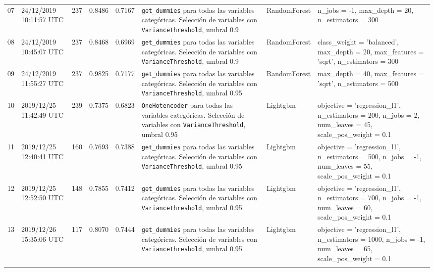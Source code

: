 \documentclass[a4paper, 20pt]{article}
\begin{document}
\begin{longtable}{lL{2cm}lllL{3cm}L{2.5cm}L{3.5cm}}
07 & 24/12/2019 10:11:57 UTC & 237 & 0.8486 & 0.7167 & \texttt{get\_dummies} para todas las variables categóricas. Selección de variables con \texttt{VarianceThreshold}, umbral 0.9 & RandomForest & {\ttfamily n\_jobs = -1, max\_depth = 20, n\_estimators = 300}\\
\midrule

08 & 24/12/2019 10:45:07 UTC & 237 & 0.8468 & 0.6969 & \texttt{get\_dummies} para todas las variables categóricas. Selección de variables con \texttt{VarianceThreshold}, umbral 0.9 & RandomForest & {\ttfamily class\_weight = 'balanced', max\_depth = 20, max\_features = 'sqrt', n\_estimators = 300}\\
\midrule

09 & 24/12/2019 11:55:27 UTC & 237 & 0.9825 & 0.7177 & \texttt{get\_dummies} para todas las variables categóricas. Selección de variables con \texttt{VarianceThreshold}, umbral 0.95 & RandomForest & {\ttfamily max\_depth = 40, max\_features = 'sqrt', n\_estimators = 500}\\
\midrule

10 & 2019/12/25 11:42:49 UTC & 239 & 0.7375 & 0.6823 & \texttt{OneHotencoder} para todas las variables categóricas. Selección de variables con \texttt{VarianceThreshold}, umbral 0.95 & Lightgbm & {\ttfamily objective = 'regression\_l1', n\_estimators = 200, n\_jobs = 2, num\_leaves = 45, scale\_pos\_weight = 0.1}\\
\midrule

11 & 2019/12/25 12:40:41 UTC & 160 & 0.7693 & 0.7388 & \texttt{get\_dummies} para todas las variables categóricas. Selección de variables con \texttt{VarianceThreshold}, umbral 0.95 & Lightgbm & {\ttfamily objective = 'regression\_l1', n\_estimators = 500, n\_jobs = -1, num\_leaves = 55, scale\_pos\_weight = 0.1}\\
\midrule

12 & 2019/12/25 12:52:50 UTC & 148 & 0.7855 & 0.7412 & \texttt{get\_dummies} para todas las variables categóricas. Selección de variables con \texttt{VarianceThreshold}, umbral 0.95 & Lightgbm & {\ttfamily objective = 'regression\_l1', n\_estimators = 700, n\_jobs = -1, num\_leaves = 60, scale\_pos\_weight = 0.1}\\
\midrule

13 & 2019/12/26 15:35:06 UTC & 117 & 0.8070 & 0.7444 & \texttt{get\_dummies} para todas las variables categóricas. Selección de variables con \texttt{VarianceThreshold}, umbral 0.95 & Lightgbm & {\ttfamily objective = 'regression\_l1', n\_estimators = 1000, n\_jobs = -1, num\_leaves = 65, scale\_pos\_weight = 0.1}\\
\midrule


\end{longtable}
\end{document}
